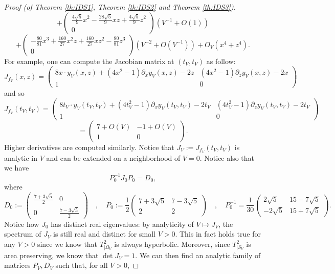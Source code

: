 \documentclass[10pt,a4paper]{amsart}
\begin{document}
\begin{proof}[Proof (of Theorem \ref{th:IDS1}, Theorem \ref{th:IDS2} and Theorem \ref{th:IDS3})]
$$ + \begin{pmatrix} \frac{4\sqrt{5}}{9} x^2 -\frac{28\sqrt{5}}{9}  xz + \frac{4\sqrt{5}}{9} z^2 \\ 0 \end{pmatrix} (V^{-1} + O(1)) $$ $$ +\begin{pmatrix} -\frac{80}{81} x^3 + \frac{160}{27} x^2 z + \frac{160}{27} x z^2 - \frac{80}{81} z^3 \\ 0 \end{pmatrix} (V^{-2} + O(V^{-1}))  + O_V(x^4+z^4). $$
For example, one can compute the Jacobian matrix at $(t_V,t_V)$ as follow:
$$ J_{f_V}(x,z) = \begin{pmatrix} 8x \cdot y_V(x,z) + (4x^2-1) \partial_xy_V(x,z) -2z & (4x^2-1) \partial_z y_V(x,z) - 2x \\ 1 & 0 \end{pmatrix} $$ 
and so
$$ J_{f_V}(t_V,t_V) = \begin{pmatrix} 8t_V \cdot y_V(t_V,t_V) + (4t_V^2-1)\partial_x y_V(t_V,t_V) - 2 t_V & (4t_V^2-1) \partial_z y_V(t_V,t_V) - 2t_V \\ 1 & 0 \end{pmatrix} $$ $$= \begin{pmatrix} 7  + O(V) & -1  + O(V) \\ 1 & 0 \end{pmatrix} . $$
Higher derivatives are computed similarly. Notice that $J_V := J_{f_V}(t_V,t_V)$ is analytic in $V$ and can be extended on a neighborhood of $V=0$. Notice also that we have
$$ P_0^{-1} J_0 P_0 = D_0, $$
where $$ D_0 := \begin{pmatrix} \frac{7+3\sqrt{5}}{2} & 0 \\ 0 & \frac{7-3\sqrt{5}}{2}  \end{pmatrix}  \quad , \quad P_0 := \frac{1}{2}\begin{pmatrix} 7+3\sqrt{5} & 7-3\sqrt{5} \\ 2 & 2 \end{pmatrix} \quad , \quad P_0^{-1} = \frac{1}{30}\begin{pmatrix} 2\sqrt{5} & 15-7 \sqrt{5} \\ -2\sqrt{5} & 15+7\sqrt{5} \end{pmatrix}.$$
Notice how $J_0$ has distinct real eigenvalues: by analyticity of $V \mapsto J_V$, the spectrum of $J_V$ is still real and distinct for small $V>0$. This in fact holds true for any $V>0$ since we know that $T_{|\Omega_V}^2$ is always hyperbolic. Moreover, since $T^2_{|S_V}$ is area preserving, we know that $\det J_V=1$. We can then find an analytic family of matrices $P_V,D_V$ such that, for all $V>0$,

\end{proof}
\end{document}
